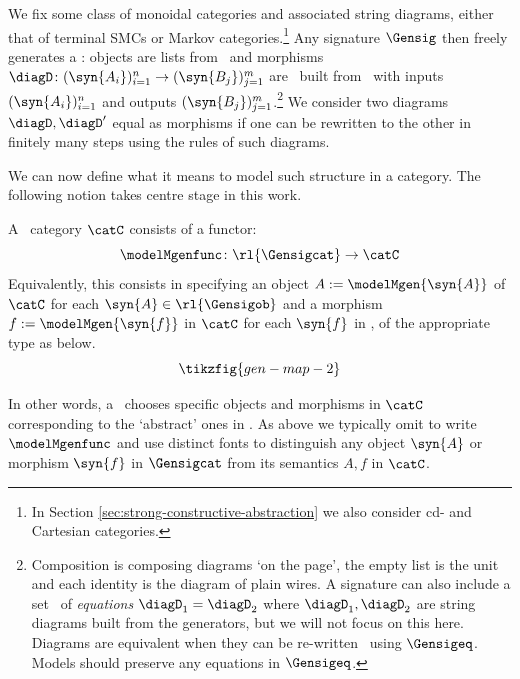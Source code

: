 \documentclass{article}
\begin{document}
We fix some class of monoidal categories and associated string diagrams, either that of terminal SMCs or Markov categories.\footnote{In Section \ref{sec:strong-constructive-abstraction} we also consider cd- and Cartesian categories.} Any signature $\Gensig$ then freely 
generates a : objects are lists from \rl{$\Gensigob$}\ and morphisms $\diagD \colon (\syn{A_i})^n_{i=1} \to (\syn{B_j})^m_{j=1}$ are \ built from \rl{$\Gensigmor$}\ with inputs $(\syn{A_i})^n_{i=1}$ and outputs $(\syn{B_j})^m_{j=1}$.\footnote{Composition is composing diagrams `on the page', the empty list is the unit and each identity is the diagram of plain wires. A signature can also include a set \rl{$\Gensigeq$}\ of \emph{equations} $\diagD_1 = \diagD_2$  where $\diagD_1, \diagD_2$ are string diagrams built from the generators, but we will not focus on this here. Diagrams are equivalent when they can be re-written \ using $\Gensigeq$. Models should preserve any equations in $\Gensigeq$.} 
We consider two diagrams $\diagD, \diagD'$ equal as morphisms if one can be rewritten to the other in finitely many steps using the rules of such diagrams. 


We can now define what it means to model such structure in a category. The following notion takes centre stage in this work. 


\begin{definition}[\rl{Model}]
A \ category $\catC$ consists of a functor: 
\[
\modelMgenfunc \colon \rl{\Gensigcat} \to \catC
\]
Equivalently, this consists in specifying an object $A := \modelMgen{\syn{A}}$ of $\catC$ for each $\syn{A} \in \rl{\Gensigob}$ and a morphism $f := \modelMgen{{\syn{f}}}$ in $\catC$ for each $\syn{f}$ in \rl{$\Gensigmor$}, of the appropriate type as below.
\begin{equation} \label{eq:generator-map} 
\tikzfig{gen-map-2}
\end{equation}
\end{definition} 

In other words, a \ chooses specific objects and morphisms in $\catC$ corresponding to the `abstract' ones in \rl{$\Gensig$}. As above we typically omit to write $\modelMgenfunc$ and use distinct fonts to distinguish any object $\syn{A}$ or morphism $\syn{f}$ in $\Gensigcat$ from its semantics $A, f$ in $\catC$.
\end{document}
